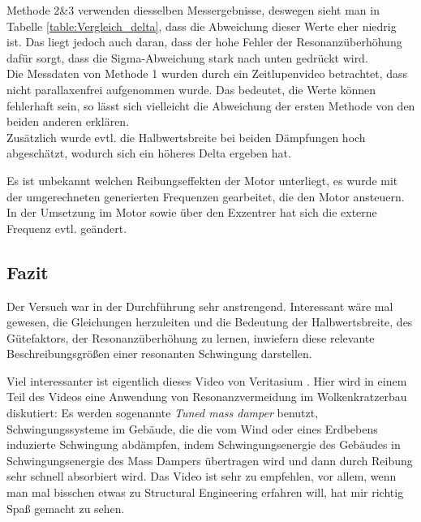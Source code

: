 Methode 2\&3 verwenden diesselben Messergebnisse, deswegen sieht man in Tabelle \cref{table:Vergleich_delta}, dass die Abweichung dieser Werte eher niedrig ist. Das liegt jedoch auch daran, dass der hohe Fehler der Resonanzüberhöhung dafür sorgt, dass die Sigma-Abweichung stark nach unten gedrückt wird.\\
Die Messdaten von Methode 1 wurden durch ein Zeitlupenvideo betrachtet, dass nicht parallaxenfrei aufgenommen wurde. Das bedeutet, die Werte können fehlerhaft sein, so lässt sich vielleicht die Abweichung der ersten Methode von den beiden anderen erklären.\\
Zusätzlich wurde evtl. die Halbwertsbreite bei beiden Dämpfungen hoch abgeschätzt, wodurch sich ein höheres Delta ergeben hat. 

Es ist unbekannt welchen Reibungseffekten der Motor unterliegt, es wurde mit der umgerechneten generierten Frequenzen gearbeitet, die den Motor ansteuern. In der Umsetzung im Motor sowie über den Exzentrer hat sich die externe Frequenz evtl. geändert.

\subsection{Fazit}
Der Versuch war in der Durchführung sehr anstrengend. Interessant wäre mal gewesen, die Gleichungen herzuleiten und die Bedeutung der Halbwertsbreite, des Gütefaktors, der Resonanzüberhöhung zu lernen, inwiefern diese relevante Beschreibungsgrößen einer resonanten Schwingung darstellen. 

Viel interessanter ist eigentlich dieses Video von Veritasium \autocite{veritasium_skyscraper}. Hier wird in einem Teil des Videos eine Anwendung von Resonanzvermeidung im Wolkenkratzerbau diskutiert: Es werden sogenannte \emph{Tuned mass damper} benutzt, Schwingungssysteme im Gebäude, die die vom Wind oder eines Erdbebens induzierte Schwingung abdämpfen, indem Schwingungsenergie des Gebäudes in Schwingungsenergie des Mass Dampers übertragen wird und dann durch Reibung sehr schnell absorbiert wird.
Das Video ist sehr zu empfehlen, vor allem, wenn man mal bisschen etwas zu Structural Engineering erfahren will, hat mir richtig Spaß gemacht zu sehen.

